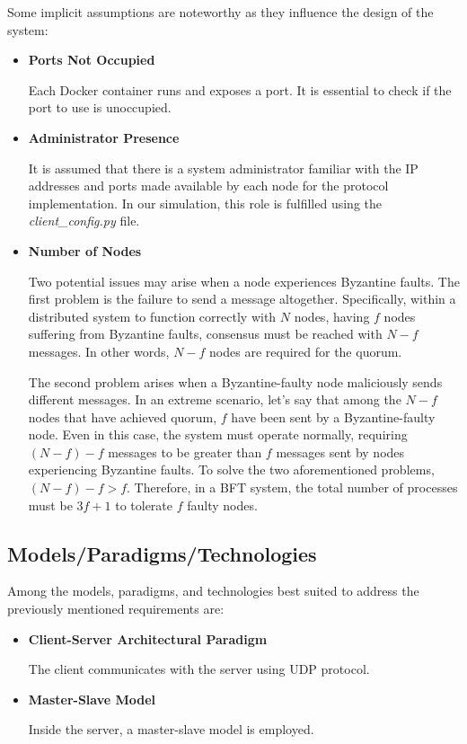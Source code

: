 \documentclass{scrartcl}
\begin{document}
Some implicit assumptions are noteworthy as they influence the design of the system:

\begin{itemize}
    \item \textbf{Ports Not Occupied}
    
    Each Docker container runs and exposes a port. It is essential to check if the port to use is unoccupied.
    
    \item \textbf{Administrator Presence}
    
    It is assumed that there is a system administrator familiar with the IP addresses and ports made available by each node for the protocol implementation. In our simulation, this role is fulfilled using the \emph{client\_config.py} file.
    
    \item \textbf{Number of Nodes}
    
    Two potential issues may arise when a node experiences Byzantine faults. The first problem is the failure to send a message altogether. Specifically, within a distributed system to function correctly with \(N\) nodes, having \(f\) nodes suffering from Byzantine faults, consensus must be reached with \(N - f\) messages. In other words, \(N - f\) nodes are required for the quorum. 

    The second problem arises when a Byzantine-faulty node maliciously sends different messages. In an extreme scenario, let's say that among the \(N - f\) nodes that have achieved quorum, \(f\) have been sent by a Byzantine-faulty node. Even in this case, the system must operate normally, requiring \((N - f) - f\) messages to be greater than \(f\) messages sent by nodes experiencing Byzantine faults. To solve the two aforementioned problems, \((N - f) - f > f\). Therefore, in a BFT system, the total number of processes must be \(3f + 1\) to tolerate \(f\) faulty nodes.
    
\end{itemize}

\subsection{Models/Paradigms/Technologies}

Among the models, paradigms, and technologies best suited to address the previously mentioned requirements are:

\begin{itemize}
    \item \textbf{Client-Server Architectural Paradigm}
    
    The client communicates with the server using UDP protocol.
    \item \textbf{Master-Slave Model}
    
    Inside the server, a master-slave model is employed.
\end{itemize}
\end{document}
